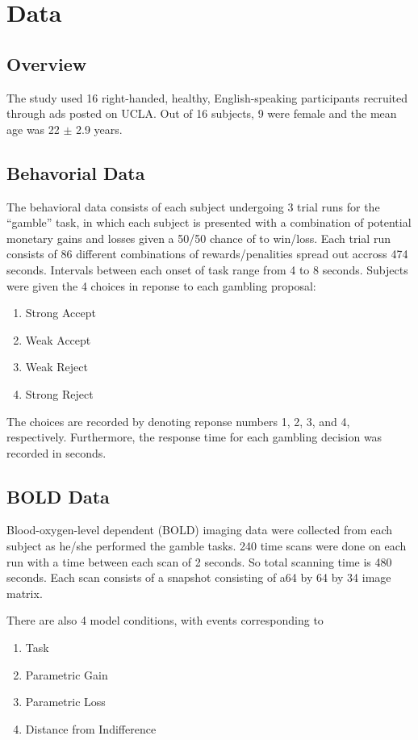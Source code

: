 \section{Data}
\subsection{Overview}
The study used 16 right-handed, healthy, English-speaking participants 
recruited through ads posted on UCLA. Out of 16 subjects, 9 were female and 
the mean age was 22 $ \pm $ 2.9 years. \cite{Tom2007LossAversion}

\subsection{Behavorial Data}
The behavioral data consists of each subject undergoing 3 trial runs for the 
``gamble'' task, in which each subject is presented with a combination of 
potential monetary gains and losses given a 50/50 chance of to win/loss. Each 
trial run consists of 86 different combinations of rewards/penalities spread 
out accross 474 seconds. Intervals between each onset of task range from 4 to 
8 seconds. Subjects were given the 4 choices in reponse to each gambling 
proposal:
\begin{enumerate}
  \item Strong Accept
  \item Weak Accept
  \item Weak Reject
  \item Strong Reject
\end{enumerate}
The choices are recorded by denoting reponse numbers 1, 2, 3, and 4, 
respectively. Furthermore, the response time for each gambling decision was 
recorded in seconds. 
\subsection{BOLD Data}
Blood-oxygen-level dependent (BOLD) imaging data were collected from each 
subject as he/she performed the gamble tasks. 240 time scans were done on each 
run with a time between each scan of 2 seconds. So total scanning time is 480 
seconds. Each scan consists of a snapshot consisting of a64 by 64 by 34 image 
matrix. 

There are also 4 model conditions, with events corresponding to 
\begin{enumerate}
  \item Task
  \item Parametric Gain
  \item Parametric Loss
  \item Distance from Indifference
\end{enumerate}

